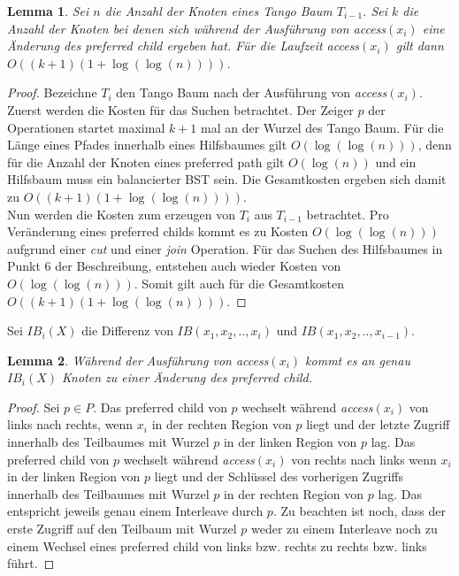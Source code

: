 \documentclass[a4paper,12pt]{article}
\newtheorem{Lemma}{Lemma}[section]
\begin{document}
 
\begin{Lemma} \label{demaineLemma4}
	Sei $n$ die Anzahl der Knoten eines Tango Baum $T_{i-1}$. Sei $k$ die Anzahl der Knoten bei denen sich während der Ausführung von \textit{access}$\left(x_i\right)$ eine Änderung des preferred child ergeben hat. Für die Laufzeit \textit{access}$\left(x_i\right)$ gilt dann $O\left(\left(k + 1\right) \left(1 + \log \left( \log  \left(n \right)\right)\right)\right)$.
\end{Lemma}
\begin{proof}
	Bezeichne $T_i$ den Tango Baum nach der Ausführung von \textit{access}$\left(x_i\right)$. Zuerst werden die Kosten für das Suchen betrachtet. Der Zeiger $p$ der Operationen startet maximal $k + 1$ mal an der Wurzel des Tango Baum. Für die Länge eines Pfades innerhalb eines Hilfsbaumes gilt $O\left(\log \left( \log  \left(n \right)\right)\right)$, denn für die Anzahl der Knoten eines preferred path gilt $O\left( \log \left(n\right)  \right)$ und ein Hilfsbaum muss ein balancierter BST sein. Die Gesamtkosten ergeben sich damit zu $O\left(\left(k + 1\right) \left(1 + \log \left( \log  \left(n \right)\right)\right)\right)$.\\
	Nun werden die Kosten zum erzeugen von $T_i$ aus $T_{i-1}$ betrachtet. Pro Veränderung eines preferred childs kommt es zu Kosten $O\left( \log\left(\log \left(n\right)\right)\right)$ aufgrund einer \textit{cut} und einer \textit{join} Operation. Für das Suchen des Hilfsbaumes in Punkt $6$ der Beschreibung, entstehen auch wieder Kosten von $O\left(\log \left( \log  \left(n \right)\right)\right)$. Somit gilt auch für die Gesamtkosten $O\left(\left(k + 1\right) \left(1 + \log \left( \log  \left(n \right)\right)\right)\right)$.
	
	
\end{proof}
\noindent Sei $\mathit{IB}_i\left(X\right)$ die Differenz von $\mathit{IB}\left(x_1, x_2,..,x_i\right)$ und  $\mathit{IB}\left(x_1, x_2,..,x_{i-1}\right)$. 

\begin{Lemma} \label{demaineLemma5}
	Während der Ausführung von \textit{access}$\left(x_i\right)$ kommt es an genau $\mathit{IB}_i\left(X\right)$ Knoten zu einer Änderung des preferred child.
\end{Lemma}
\begin{proof}
	Sei $p \in P$. Das preferred child von $p$ wechselt während  \textit{access}$\left(x_i\right)$ von links nach rechts,  wenn $x_i$ in der rechten Region von $p$ liegt und der letzte Zugriff innerhalb des Teilbaumes mit Wurzel $p$ in der linken Region von $p$ lag.  Das preferred child von $p$ wechselt während  \textit{access}$\left(x_i\right)$ von rechts nach links  wenn $x_i$ in der linken Region von $p$ liegt und der Schlüssel des vorherigen Zugriffs innerhalb des Teilbaumes mit Wurzel $p$ in der rechten Region von $p$ lag. Das entspricht jeweils genau einem Interleave durch $p$. Zu beachten ist noch, dass der erste Zugriff auf den Teilbaum mit Wurzel $p$ weder zu einem Interleave noch zu einem Wechsel eines preferred child von links bzw. rechts zu rechts bzw. links führt. 	
\end{proof}
\end{document}
